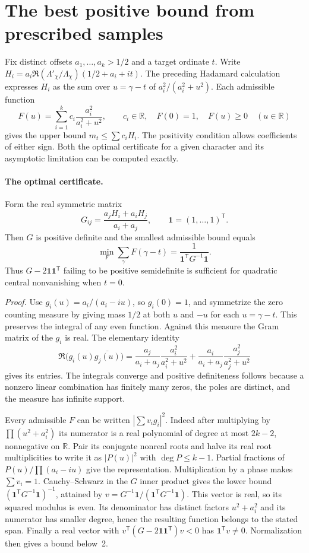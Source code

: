 \section{The best positive bound from prescribed samples}

Fix distinct offsets $a_1,\ldots,a_k>1/2$ and a target ordinate $t$. Write
$H_i=a_i\Re (\Lambda'_\chi/\Lambda_\chi)(1/2+a_i+it)$.
The preceding Hadamard calculation expresses $H_i$ as the sum over
$u=\gamma-t$ of $a_i^2/(a_i^2+u^2)$. Each admissible function
\[
 F(u)=\sum_{i=1}^k c_i\frac{a_i^2}{a_i^2+u^2},\qquad
 c_i\in\mathbb R,\quad F(0)=1,\quad F(u)\ge0\quad(u\in\mathbb R)
\]
gives the upper bound $m_t\le\sum c_iH_i$. The positivity condition
allows coefficients of either sign. Both the optimal certificate for a
given character and its asymptotic limitation can be computed exactly.

\paragraph{The optimal certificate.}
Form the real symmetric matrix
\[
 G_{ij}=\frac{a_jH_i+a_iH_j}{a_i+a_j},\qquad
 \mathbf1=(1,\ldots,1)^{\mathsf T}.
\]
Then $G$ is positive definite and the smallest admissible bound equals
\[
 \min_F\sum_\gamma F(\gamma-t)
    =\frac{1}{\mathbf1^{\mathsf T}G^{-1}\mathbf1}.
\]
Thus $G-2\mathbf1\mathbf1^{\mathsf T}$ failing to be positive
semidefinite is sufficient for quadratic central nonvanishing when $t=0$.

\emph{Proof.}
Use $g_i(u)=a_i/(a_i-iu)$, so $g_i(0)=1$, and symmetrize the zero
counting measure by giving mass $1/2$ at both $u$ and $-u$ for each
$u=\gamma-t$. This preserves the integral of any even function. Against
this measure the Gram matrix of the $g_i$ is real. The elementary identity
\[
 \Re\bigl(g_i(u)\overline{g_j(u)}\bigr)
 =\frac{a_j}{a_i+a_j}\frac{a_i^2}{a_i^2+u^2}
  +\frac{a_i}{a_i+a_j}\frac{a_j^2}{a_j^2+u^2}
\]
gives its entries. The integrals converge and positive definiteness
follows because a nonzero linear combination has finitely many zeros,
the poles are distinct, and the measure has infinite support.

Every admissible $F$ can be written $|\sum v_i g_i|^2$.
Indeed after multiplying by $\prod (u^2+a_i^2)$ its numerator is a real
polynomial of degree at most $2k-2$, nonnegative on $\mathbb R$.
Pair its conjugate nonreal roots and halve its real root multiplicities
to write it as $|P(u)|^2$ with $\deg P\le k-1$. Partial fractions
of $P(u)/\prod(a_i-iu)$ give the representation.
Multiplication by a phase makes $\sum v_i=1$.
Cauchy--Schwarz in the $G$ inner product gives the lower bound
$(\mathbf1^{\mathsf T}G^{-1}\mathbf1)^{-1}$, attained by
$v=G^{-1}\mathbf1/(\mathbf1^{\mathsf T}G^{-1}\mathbf1)$.
This vector is real, so its squared modulus is even. Its denominator
has distinct factors $u^2+a_i^2$ and its numerator has smaller degree,
hence the resulting function belongs to the stated span.
Finally a real vector with $v^{\mathsf T}(G-2\mathbf1\mathbf1^{\mathsf T})v<0$
has $\mathbf1^{\mathsf T}v\ne0$. Normalization then gives a bound below~2.

